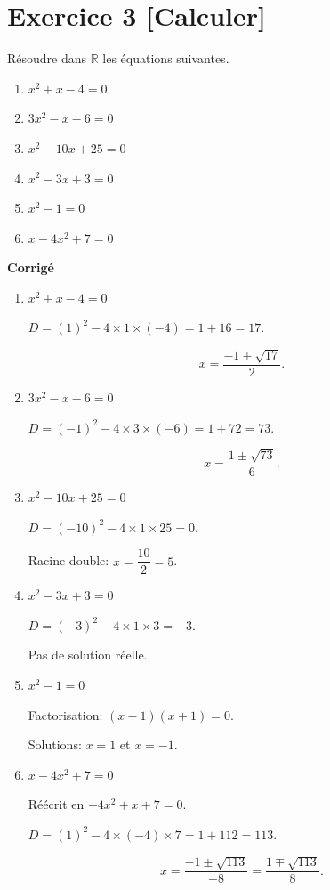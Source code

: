 \documentclass{article}
\begin{document}
\section*{Exercice 3 \textbf{[Calculer]}}

Résoudre dans $\mathbb{R}$ les équations suivantes.
\begin{enumerate}
    \item $x^2 + x - 4 = 0$
    \item $3x^2 - x - 6 = 0$
    \item $x^2 - 10x + 25 = 0$
    \item $x^2 - 3x + 3 = 0$
    \item $x^2 - 1 = 0$
    \item $x - 4x^2 + 7 = 0$
\end{enumerate}

\textbf{Corrigé}

\begin{enumerate}
    \item $x^2 + x - 4 = 0$

    $D = (1)^2 - 4 \times 1 \times (-4) = 1 + 16 = 17$.

    \[
    x = \dfrac{-1 \pm \sqrt{17}}{2}.
    \]

    \item $3x^2 - x - 6 = 0$

    $D = (-1)^2 - 4 \times 3 \times (-6) = 1 + 72 = 73$.

    \[
    x = \dfrac{1 \pm \sqrt{73}}{6}.
    \]

    \item $x^2 - 10x + 25 = 0$

    $D = (-10)^2 - 4 \times 1 \times 25 = 0$.

    Racine double: $x = \dfrac{10}{2} = 5$.

    \item $x^2 - 3x + 3 = 0$

    $D = (-3)^2 - 4 \times 1 \times 3 = -3$.

    Pas de solution réelle.

    \item $x^2 - 1 = 0$

    Factorisation: $(x - 1)(x + 1) = 0$.

    Solutions: $x = 1$ et $x = -1$.

    \item $x - 4x^2 + 7 = 0$

    Réécrit en $-4x^2 + x + 7 = 0$.

    $D = (1)^2 - 4 \times (-4) \times 7 = 1 + 112 = 113$.

    \[
    x = \dfrac{-1 \pm \sqrt{113}}{-8} = \dfrac{1 \mp \sqrt{113}}{8}.
    \]
\end{enumerate}
\end{document}
